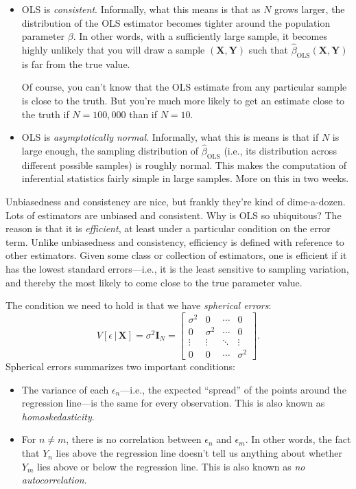 \documentclass[
  12pt,
  oneside,openany]{book}
\begin{document}
\begin{itemize}
\item
  OLS is \emph{consistent}. Informally, what this means is that as \(N\) grows larger, the distribution of the OLS estimator becomes tighter around the population parameter \(\beta\). In other words, with a sufficiently large sample, it becomes highly unlikely that you will draw a sample \((\mathbf{X}, \mathbf{Y})\) such that \(\hat{\beta}_{\text{OLS}}(\mathbf{X}, \mathbf{Y})\) is far from the true value.

  Of course, you can't know that the OLS estimate from any particular sample is close to the truth. But you're much more likely to get an estimate close to the truth if \(N = 100{,}000\) than if \(N = 10\).
\item
  OLS is \emph{asymptotically normal}. Informally, what this is means is that if \(N\) is large enough, the sampling distribution of \(\hat{\beta}_{\text{OLS}}\) (i.e., its distribution across different possible samples) is roughly normal. This makes the computation of inferential statistics fairly simple in large samples. More on this in two weeks.
\end{itemize}

Unbiasedness and consistency are nice, but frankly they're kind of dime-a-dozen. Lots of estimators are unbiased and consistent. Why is OLS so ubiquitous? The reason is that it is \emph{efficient}, at least under a particular condition on the error term. Unlike unbiasedness and consistency, efficiency is defined with reference to other estimators. Given some class or collection of estimators, one is efficient if it has the lowest standard errors---i.e., it is the least sensitive to sampling variation, and thereby the most likely to come close to the true parameter value.

The condition we need to hold is that we have \emph{spherical errors}:
\[
V[\epsilon \,|\, \mathbf{X}] = \sigma^2 \mathbf{I}_N
= \begin{bmatrix}
  \sigma^2 & 0 & \cdots & 0 \\
  0 & \sigma^2 & \cdots & 0 \\
  \vdots & \vdots & \ddots & \vdots \\
  0 & 0 & \cdots & \sigma^2
\end{bmatrix}.
\]
Spherical errors summarizes two important conditions:

\begin{itemize}
\item
  The variance of each \(\epsilon_n\)---i.e., the expected ``spread'' of the points around the regression line---is the same for every observation. This is also known as \emph{homoskedasticity}.
\item
  For \(n \neq m\), there is no correlation between \(\epsilon_n\) and \(\epsilon_m\). In other words, the fact that \(Y_n\) lies above the regression line doesn't tell us anything about whether \(Y_m\) lies above or below the regression line. This is also known as \emph{no autocorrelation}.
\end{itemize}
\end{document}
